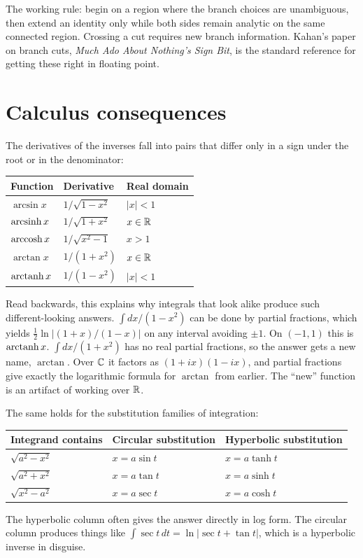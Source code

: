 \documentclass{essay}
\begin{document}
The working rule: begin on a region where the branch choices are unambiguous,
then extend an identity only while both sides remain analytic on the same
connected region. Crossing a cut requires new branch information. Kahan's paper on branch cuts,
\emph{Much Ado About Nothing's Sign Bit}, is the standard reference for getting
these right in floating point.

\section{Calculus consequences}

The derivatives of the inverses fall into pairs that differ only in a sign
under the root or in the denominator:
\begin{center}
\begin{tabular}{lll}
\toprule
Function & Derivative & Real domain \\
\midrule
$\arcsin x$ & $1/\sqrt{1 - x^2}$ & $|x|<1$ \\
$\operatorname{arcsinh} x$ & $1/\sqrt{1 + x^2}$ & $x\in\mathbb{R}$ \\
$\operatorname{arccosh} x$ & $1/\sqrt{x^2 - 1}$ & $x>1$ \\
$\arctan x$ & $1/(1 + x^2)$ & $x\in\mathbb{R}$ \\
$\operatorname{arctanh} x$ & $1/(1 - x^2)$ & $|x|<1$ \\
\bottomrule
\end{tabular}
\end{center}
Read backwards, this explains why integrals that look alike produce such
different-looking answers. $\int dx/(1 - x^2)$ can be done by partial
fractions, which yields $\tfrac12\ln\lvert(1+x)/(1-x)\rvert$ on any interval
avoiding $\pm1$. On $(-1,1)$ this is $\operatorname{arctanh} x$. $\int dx/(1 + x^2)$ has no real
partial fractions, so the answer gets a new name, $\arctan$. Over $\mathbb{C}$ it
factors as $(1 + ix)(1 - ix)$, and partial fractions give exactly the
logarithmic formula for $\arctan$ from earlier. The ``new'' function is an
artifact of working over $\mathbb{R}$.

The same holds for the substitution families of integration:
\begin{center}
\begin{tabular}{lll}
\toprule
Integrand contains & Circular substitution & Hyperbolic substitution \\
\midrule
$\sqrt{a^2 - x^2}$ & $x = a \sin t$ & $x = a \tanh t$ \\
$\sqrt{a^2 + x^2}$ & $x = a \tan t$ & $x = a \sinh t$ \\
$\sqrt{x^2 - a^2}$ & $x = a \sec t$ & $x = a \cosh t$ \\
\bottomrule
\end{tabular}
\end{center}
The hyperbolic column often gives the answer directly in log form. The circular
column produces things like $\int \sec t \, dt = \ln\lvert \sec t + \tan t
\rvert$, which is a hyperbolic inverse in disguise.
\end{document}
